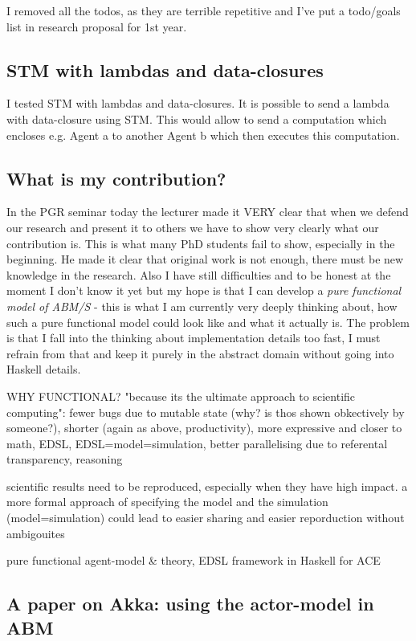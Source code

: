 I removed all the todos, as they are terrible repetitive and I've put a todo/goals list in research proposal for 1st year.

\subsection*{STM with lambdas and data-closures}
I tested STM with lambdas and data-closures. It is possible to send a lambda with data-closure using STM. This would allow to send a computation which encloses e.g. Agent a to another Agent b which then executes this computation.

\subsection*{What is my contribution?}
In the PGR seminar today the lecturer made it VERY clear that when we defend our research and present it to others we have to show very clearly what our contribution is. This is what many PhD students fail to show, especially in the beginning. He made it clear that original work is not enough, there must be new knowledge in the research. Also I have still difficulties and to be honest at the moment I don't know it yet but my hope is that I can develop a \textit{pure functional model of ABM/S} - this is what I am currently very deeply thinking about, how such a pure functional model could look like and what it actually is. The problem is that I fall into the thinking about implementation details too fast, I must refrain from that and keep it purely in the abstract domain without going into Haskell details.

WHY FUNCTIONAL? "because its the ultimate approach to scientific computing": fewer bugs due to mutable state (why? is thos shown obkectively by someone?), shorter (again as above, productivity), more expressive and closer to math, EDSL, EDSL=model=simulation, better parallelising due to referental transparency, reasoning

scientific results need to be reproduced, especially when they have high impact. a more formal approach of specifying the model and the simulation (model=simulation) could lead to easier sharing and easier reporduction without ambigouites

pure functional agent-model \& theory, EDSL framework in Haskell for ACE

\subsection*{A paper on Akka: using the actor-model in ABM}

